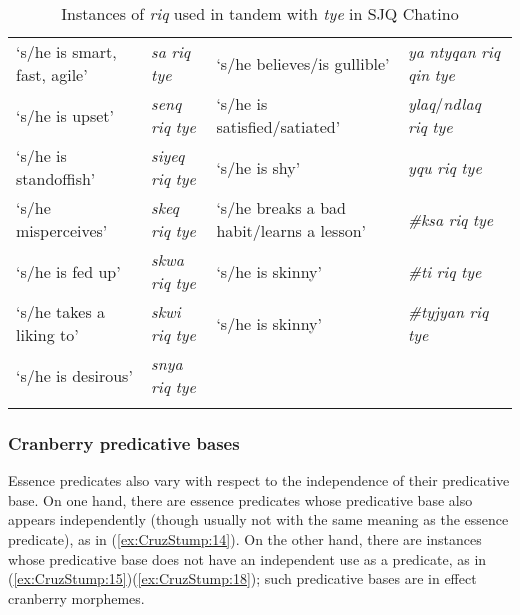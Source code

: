 \documentclass[output=paper]{langsci/langscibook}
\begin{document}
\begin{table}
\begin{tabularx}{\textwidth}{QlQl}
`s/he is smart, fast, agile'&\emph{sa} \emph{riq} \emph{tye}&`s/he believes/is gullible'&\emph{ya} \emph{ntyqan} \emph{riq} \emph{qin} \emph{tye} \\
`s/he is upset'&\emph{senq} \emph{riq} \emph{tye}&`s/he is satisfied/satiated'&\emph{ylaq}/\emph{ndlaq} \emph{riq} \emph{tye} \\
`s/he is standoffish'&\emph{siyeq} \emph{riq} \emph{tye}&`s/he is shy'&\emph{yqu} \emph{riq} \emph{tye} \\
`s/he misperceives'&\emph{skeq} \emph{riq} \emph{tye}&`s/he breaks a bad habit/learns a lesson'&\emph{\#ksa} \emph{riq} \emph{tye} \\
`s/he is fed up'&\emph{skwa} \emph{riq} \emph{tye}&`s/he is skinny'&\emph{\#ti} \emph{riq} \emph{tye} \\
`s/he takes a liking to'&\emph{skwi} \emph{riq} \emph{tye}&`s/he is skinny'&\emph{\#tyjyan} \emph{riq} \emph{tye} \\
`s/he is desirous'&\emph{snya} \emph{riq} \emph{tye} \\
\lspbottomrule
\end{tabularx}
\caption{Instances of \emph{riq} used in tandem with \emph{tye} in SJQ Chatino}

\label{tab:CruzStump:sjq-17}
\end{table}




\subsubsection{Cranberry predicative bases}
Essence predicates also vary with respect to the independence of their predicative base. On one
hand, there are essence predicates whose predicative base also appears independently (though
usually not with the same meaning as the essence predicate), as in (\ref{ex:CruzStump:14}). On the other hand, there are
instances whose predicative base does not have an independent use as a predicate, as in (\ref{ex:CruzStump:15})\textendash(\ref{ex:CruzStump:18});
such predicative bases are in effect cranberry morphemes.
\end{document}
